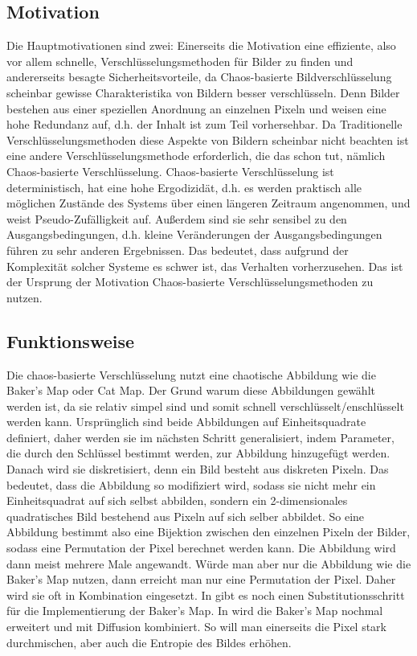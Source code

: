 \subsection{Motivation}
Die Hauptmotivationen sind zwei: Einerseits die Motivation eine effiziente, also vor allem schnelle, Verschlüsselungsmethoden
für Bilder zu finden und andererseits besagte Sicherheitsvorteile, da Chaos-basierte Bildverschlüsselung scheinbar
gewisse Charakteristika von Bildern besser verschlüsseln. Denn Bilder bestehen aus einer speziellen Anordnung an einzelnen Pixeln
und weisen eine hohe Redundanz auf, d.h. der Inhalt ist zum Teil vorhersehbar.
Da Traditionelle Verschlüsselungsmethoden diese Aspekte von Bildern scheinbar nicht beachten ist eine andere Verschlüsselungsmethode erforderlich, die
das schon tut, nämlich Chaos-basierte Verschlüsselung.
Chaos-basierte Verschlüsselung ist deterministisch, hat eine hohe Ergodizidät, d.h. es werden praktisch alle
möglichen Zustände des Systems über einen längeren Zeitraum angenommen, und weist Pseudo-Zufälligkeit auf. Außerdem
sind sie sehr sensibel zu den Ausgangsbedingungen, d.h. kleine Veränderungen der Ausgangsbedingungen führen zu
sehr anderen Ergebnissen. Das bedeutet, dass aufgrund der Komplexität solcher Systeme es schwer ist,
das Verhalten vorherzusehen. Das ist der Ursprung der Motivation Chaos-basierte Verschlüsselungsmethoden zu nutzen.
\cite{zhang2023} \cite{chaos}

\subsection{Funktionsweise} %
Die chaos-basierte Verschlüsselung nutzt eine chaotische Abbildung wie die Baker's Map oder Cat Map.
Der Grund warum diese Abbildungen gewählt werden ist, da
sie relativ simpel sind und somit schnell verschlüsselt/enschlüsselt werden kann. Ursprünglich sind beide Abbildungen auf
Einheitsquadrate definiert, daher werden sie im nächsten Schritt generalisiert, indem Parameter, die durch den Schlüssel bestimmt werden, 
zur Abbildung hinzugefügt werden.
Danach wird sie diskretisiert, denn ein Bild besteht aus diskreten Pixeln. Das bedeutet, dass die Abbildung so
modifiziert wird, sodass sie nicht mehr ein Einheitsquadrat auf sich selbst abbilden, sondern ein 2-dimensionales quadratisches
Bild bestehend aus Pixeln auf sich selber abbildet. So eine Abbildung bestimmt also eine Bijektion zwischen den einzelnen Pixeln
der Bilder, sodass eine Permutation der Pixel berechnet werden kann. Die Abbildung wird dann meist mehrere Male angewandt.
Würde man aber nur die Abbildung wie die Baker's Map nutzen, dann
erreicht man nur eine Permutation der Pixel. Daher wird sie oft in Kombination eingesetzt. In \cite{chaos} gibt es noch einen Substitutionsschritt
für die Implementierung der Baker's Map. In \cite{fridrich97} wird die Baker's Map nochmal erweitert und mit Diffusion kombiniert. So
will man einerseits die Pixel stark durchmischen, aber auch die Entropie des Bildes erhöhen.
\cite{fridrich97} \cite{chaos}


